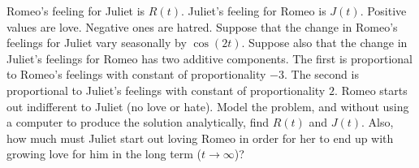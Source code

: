 \documentclass{article}
\begin{document}
\newline Romeo's feeling for Juliet is $R(t)$.  Juliet's feeling for Romeo is $J(t)$.  Positive values are love.  Negative ones are hatred.  Suppose that the change in Romeo's feelings for Juliet vary seasonally by $\cos{(2t)}$.  Suppose also that the change in Juliet's feelings for Romeo has two additive components.  The first is proportional to Romeo's feelings with constant of proportionality $-3$.  The second is proportional to Juliet's feelings with constant of proportionality $2$.  Romeo starts out indifferent to Juliet (no love or hate).  Model the problem, and without using a computer to produce the solution analytically, find $R(t)$ and $J(t)$.  Also, how much must Juliet start out loving Romeo in order for her to end up with growing love for him in the long term ($t \to \infty$)?
\end{document}
